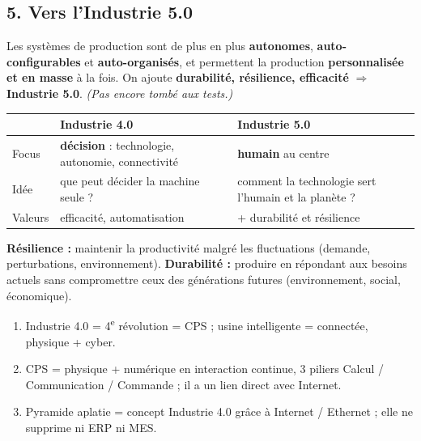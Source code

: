 \documentclass[11pt,a4paper]{article}
\begin{document}
\subsection*{5. Vers l'Industrie 5.0}
Les systèmes de production sont de plus en plus \textbf{autonomes}, \textbf{auto-configurables} et \textbf{auto-organisés}, et permettent la production \textbf{personnalisée et en masse} à la fois. On ajoute \textbf{durabilité, résilience, efficacité} $\Rightarrow$ \textbf{Industrie 5.0}. \textit{(Pas encore tombé aux tests.)}
\begin{center}
\begin{tabularx}{\linewidth}{l X X}
\toprule
& \textbf{Industrie 4.0} & \textbf{Industrie 5.0} \\
\midrule
Focus & \textbf{décision} : technologie, autonomie, connectivité & \textbf{humain} au centre \\
Idée & que peut décider la machine seule ? & comment la technologie sert l'humain et la planète ? \\
Valeurs & efficacité, automatisation & + durabilité et résilience \\
\bottomrule
\end{tabularx}
\end{center}
\textbf{Résilience :} maintenir la productivité malgré les fluctuations (demande, perturbations, environnement). \textbf{Durabilité :} produire en répondant aux besoins actuels sans compromettre ceux des générations futures (environnement, social, économique).

\begin{resume}
\begin{enumerate}
\item Industrie 4.0 = 4\textsuperscript{e} révolution = CPS ; usine intelligente = connectée, physique + cyber.
\item CPS = physique + numérique en interaction continue, 3 piliers Calcul / Communication / Commande ; il a un lien direct avec Internet.
\item Pyramide aplatie = concept Industrie 4.0 grâce à Internet / Ethernet ; elle ne supprime ni ERP ni MES.
\end{enumerate}
\end{resume}
\end{document}

